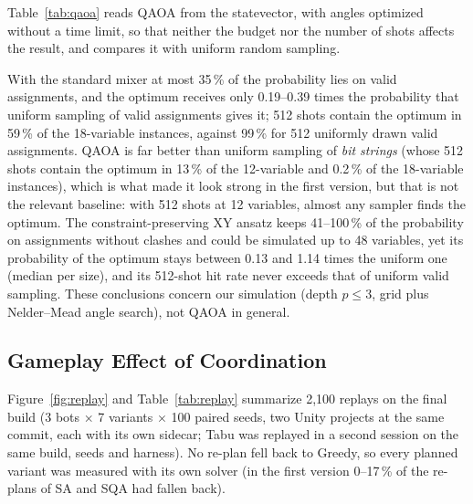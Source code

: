 \documentclass[12pt, a4paper]{article}
\begin{document}
Table~\ref{tab:qaoa} reads QAOA from the statevector, with angles optimized without a time limit, so that neither the budget nor the number of shots affects the result, and compares it with uniform random sampling.

\begin{table}[htbp]
\centering

\caption{QAOA at depth $p=3$, means over instances (30 per size; 20 and 10 for the two largest). $P_\text{valid}$, $P_\text{opt}$: probability of measuring a valid assignment, an optimal one. $P_\text{opt}$/uniform: median ratio to sampling valid assignments uniformly. hit$_{512}$: probability that 512 shots contain the optimum, for QAOA and for 512 uniformly drawn valid assignments. X: standard mixer; XY: ring-XY mixer, simulated in the one-hot sector.}
\label{tab:qaoa}
\end{table}

With the standard mixer at most 35\,\% of the probability lies on valid assignments, and the optimum receives only 0.19--0.39 times the probability that uniform sampling of valid assignments gives it; 512 shots contain the optimum in 59\,\% of the 18-variable instances, against 99\,\% for 512 uniformly drawn valid assignments. QAOA is far better than uniform sampling of \emph{bit strings} (whose 512 shots contain the optimum in 13\,\% of the 12-variable and 0.2\,\% of the 18-variable instances), which is what made it look strong in the first version, but that is not the relevant baseline: with 512 shots at 12 variables, almost any sampler finds the optimum. The constraint-preserving XY ansatz \cite{Hadfield2019,Wang2020XY} keeps 41--100\,\% of the probability on assignments without clashes and could be simulated up to 48 variables, yet its probability of the optimum stays between 0.13 and 1.14 times the uniform one (median per size), and its 512-shot hit rate never exceeds that of uniform valid sampling. These conclusions concern our simulation (depth $p\le3$, grid plus Nelder--Mead angle search), not QAOA in general.

\subsection*{Gameplay Effect of Coordination}

Figure~\ref{fig:replay} and Table~\ref{tab:replay} summarize 2{,}100 replays on the final build (3 bots $\times$ 7 variants $\times$ 100 paired seeds, two Unity projects at the same commit, each with its own sidecar; Tabu was replayed in a second session on the same build, seeds and harness). No re-plan fell back to Greedy, so every planned variant was measured with its own solver (in the first version 0--17\,\% of the re-plans of SA and SQA had fallen back).
\end{document}
